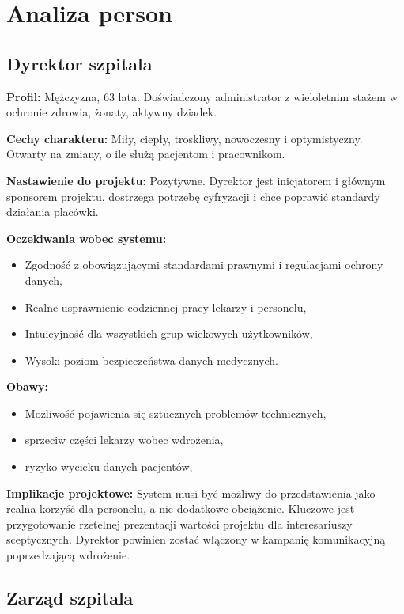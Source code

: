 \section{Analiza person}

\subsection{Dyrektor szpitala}

\textbf{Profil:} Mężczyzna, 63 lata. Doświadczony administrator z wieloletnim stażem w ochronie zdrowia, żonaty, aktywny dziadek.

\textbf{Cechy charakteru:} Miły, ciepły, troskliwy, nowoczesny i optymistyczny. Otwarty na zmiany, o ile służą pacjentom i pracownikom.

\textbf{Nastawienie do projektu:} Pozytywne. Dyrektor jest inicjatorem i głównym sponsorem projektu, dostrzega potrzebę cyfryzacji i chce poprawić standardy działania placówki.

\textbf{Oczekiwania wobec systemu:}
\begin{itemize}
    \item Zgodność z obowiązującymi standardami prawnymi i regulacjami ochrony danych,
    \item Realne usprawnienie codziennej pracy lekarzy i personelu,
    \item Intuicyjność dla wszystkich grup wiekowych użytkowników,
    \item Wysoki poziom bezpieczeństwa danych medycznych.
\end{itemize}

\textbf{Obawy:}
\begin{itemize}
    \item Możliwość pojawienia się sztucznych problemów technicznych,
    \item sprzeciw części lekarzy wobec wdrożenia,
    \item ryzyko wycieku danych pacjentów,
\end{itemize}

\textbf{Implikacje projektowe:} System musi być możliwy do przedstawienia jako realna korzyść dla personelu, a nie dodatkowe obciążenie. Kluczowe jest przygotowanie rzetelnej prezentacji wartości projektu dla interesariuszy sceptycznych. Dyrektor powinien zostać włączony w kampanię komunikacyjną poprzedzającą wdrożenie.

\subsection{Zarząd szpitala}

